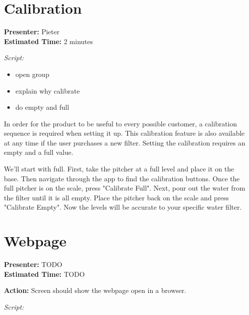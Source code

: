 \documentclass[12pt]{article}
\begin{document}
\section{Calibration}
\noindent\textbf{Presenter:} Pieter\\
\noindent\textbf{Estimated Time:} 2 minutes

\bigskip
\noindent\textit{Script:}

\begin{itemize}[itemsep=-3pt]
\item open group
\item explain why calibrate
\item do empty and full
\end{itemize}

In order for the product to be useful to every possible customer, a calibration sequence is required when setting it up. This calibration feature is also available at any time if the user purchases a new filter. Setting the calibration requires an empty and a full value. 

We'll start with full. First, take the pitcher at a full level and place it on the base. Then navigate through the app to find the calibration buttons. Once the full pitcher is on the scale, press "Calibrate Full".  Next, pour out the water from the filter until it is all empty. Place the pitcher back on the scale and press "Calibrate Empty". Now the levels will be accurate to your specific water filter. 

\section{Webpage}
\noindent\textbf{Presenter:} TODO\\
\noindent\textbf{Estimated Time:} TODO

\noindent\textbf{Action:} Screen should show the webpage open in a browser.

\bigskip
\noindent\textit{Script:}
\end{document}
